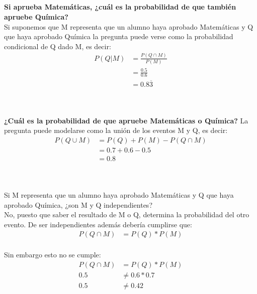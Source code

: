 \documentclass[12pt]{article}
\begin{document}
\subsection{}\textbf{Si aprueba Matemáticas, ¿cuál es la probabilidad de que también apruebe Química?}\\
Si suponemos que M representa que un alumno haya aprobado Matemáticas y Q que haya aprobado
Química la pregunta puede verse como la probabilidad condicional de Q dado M, es decir:
\begin{equation}
\begin{split}
	P(Q|M) &= \frac{P(Q\cap M)}{P(M)}\\
	&= \frac{0.5}{0.6}\\
	&= 0.8\overline{3}\\
\end{split}
\end{equation}\\
\subsection{}\textbf{¿Cuál es la probabilidad de que apruebe Matemáticas o Química?}
La pregunta puede modelarse como la unión de los eventos M y Q, es decir:
\begin{equation}
\begin{split}
P(Q\cup M) &= P(Q) + P(M) - P(Q\cap M)\\
&= 0.7 + 0.6 - 0.5\\
&= 0.8\\
\end{split}
\end{equation}\\
\subsection{} Si M representa que un alumno haya aprobado Matemáticas y Q que haya aprobado
Química, ¿son M y Q independientes?\\
No, puesto que saber el resultado de M o Q, determina la probabilidad del otro evento. 
De ser independientes además debería cumplirse que:
\begin{equation}
\begin{split}
P(Q\cap M) &= P(Q) * P(M)
\end{split}
\end{equation}\\
Sin embargo esto no se cumple:
\begin{equation}
\begin{split}
P(Q\cap M) &= P(Q) * P(M)\\
0.5 &\neq 0.6 * 0.7\\
0.5 &\neq 0.42
\end{split}
\end{equation}\\
\end{document}
